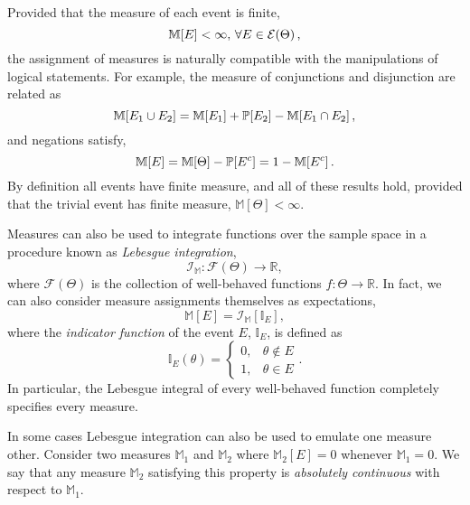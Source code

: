 Provided that the measure of each event is finite, 
%
\begin{equation*}
\mathbb{M} \! \left[ E \right] < \infty, \, \forall E \in  \mathcal{E} \! \left( \Theta \right) ,
\end{equation*}
%
the assignment of measures is naturally compatible with the manipulations 
of logical statements.  For example, the measure of conjunctions and
disjunction are related as
%
\begin{equation*}
\mathbb{M} \! \left[ E_{1} \cup E_{2} \right]
= 
\mathbb{M} \! \left[ E_{1} \right] + \mathbb{P} \! \left[ E_{2} \right] 
- \mathbb{M} \! \left[ E_{1} \cap E_{2} \right],
\end{equation*}
%
and negations satisfy,
%
\begin{equation*}
\mathbb{M} \! \left[ E \right] 
= 
\mathbb{M} \! \left[ \Theta \right] - \mathbb{P} \! \left[ E^{c} \right]
=
1 - \mathbb{M} \! \left[ E^{c} \right].
\end{equation*}
%
By definition all events have finite measure, and all of these results
hold, provided that the trivial event has finite measure, 
$\mathbb{M} \! \left[ \Theta \right] < \infty$.

Measures can also be used to integrate functions over the sample
space in a procedure known as \emph{Lebesgue integration},
%
\begin{equation*}
\mathcal{I}_{\mathbb{M}} : 
\mathcal{F} \! \left( \Theta \right) \rightarrow \mathbb{R},
\end{equation*}
%
where $\mathcal{F} \! \left( \Theta \right)$ is the collection of well-behaved 
functions $f : \Theta \rightarrow \mathbb{R}$.  In fact, we can also consider 
measure assignments themselves as expectations,
%
\begin{equation*}
\mathbb{M} \! \left[ E \right] 
= 
\mathcal{I}_{\mathbb{M}} \! \left[ \mathbb{I}_{E} \right],
\end{equation*}
%
where the \emph{indicator function} of the event $E$, $\mathbb{I}_{E}$,
is defined as
%
\begin{equation*}
\mathbb{I}_{E} \! \left( \theta \right)
= 
\left\{
\begin{array}{rr}
0, & \theta \notin E \\
1, & \theta \in E
\end{array}
\right. .
\end{equation*}
%
In particular, the Lebesgue integral of every well-behaved function
completely specifies every measure.

In some cases Lebesgue integration can also be used to emulate 
one measure other.  Consider two measures $\mathbb{M}_{1}$
and $\mathbb{M}_{2}$ where $\mathbb{M}_{2} \! \left[ E \right] = 0$
whenever $\mathbb{M}_{1} = 0$.  We say that any measure 
$\mathbb{M}_{2}$ satisfying this property is \emph{absolutely continuous} 
with respect to $\mathbb{M}_{1}$.  

